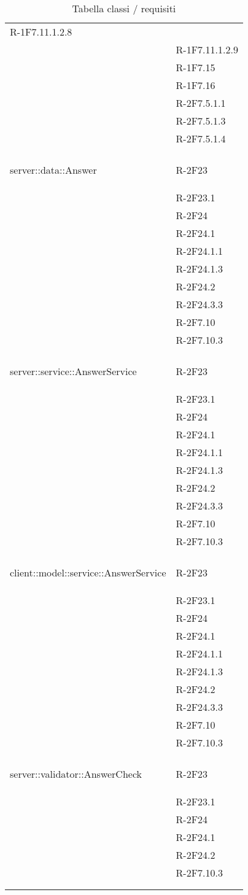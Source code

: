 \begin{longtable}{l p{3cm}}
	R-1F7.11.1.2.8 \tabularnewline &
	
	R-1F7.11.1.2.9 \tabularnewline &
	
	R-1F7.15 \tabularnewline &
	
	R-1F7.16 \tabularnewline &
	
	R-2F7.5.1.1 \tabularnewline &
	
	R-2F7.5.1.3 \tabularnewline &
	
	R-2F7.5.1.4 \tabularnewline &\tabularnewline
	\hline
	\hypertarget{server::data::Answer}{server::data::Answer} & R-2F23 \tabularnewline &
	
	R-2F23.1 \tabularnewline &
	
	R-2F24 \tabularnewline &
	
	R-2F24.1 \tabularnewline &
	
	R-2F24.1.1 \tabularnewline &
	
	R-2F24.1.3 \tabularnewline &
	
	R-2F24.2 \tabularnewline &
	
	R-2F24.3.3 \tabularnewline &
	
	R-2F7.10 \tabularnewline &
	
	R-2F7.10.3 \tabularnewline &\tabularnewline
	\hline
	\hypertarget{server::service::AnswerService}{server::service::AnswerService} & R-2F23 \tabularnewline &
	
	R-2F23.1 \tabularnewline &
	
	R-2F24 \tabularnewline &
	
	R-2F24.1 \tabularnewline &
	
	R-2F24.1.1 \tabularnewline &
	
	R-2F24.1.3 \tabularnewline &
	
	R-2F24.2 \tabularnewline &
	
	R-2F24.3.3 \tabularnewline &
	
	R-2F7.10 \tabularnewline &
	
	R-2F7.10.3 \tabularnewline &\tabularnewline
	\hline
	\hypertarget{client::model::service::AnswerService}{client::model::service::AnswerService} & R-2F23 \tabularnewline &
	
	R-2F23.1 \tabularnewline &
	
	R-2F24 \tabularnewline &
	
	R-2F24.1 \tabularnewline &
	
	R-2F24.1.1 \tabularnewline &
	
	R-2F24.1.3 \tabularnewline &
	
	R-2F24.2 \tabularnewline &
	
	R-2F24.3.3 \tabularnewline &
	
	R-2F7.10 \tabularnewline &
	
	R-2F7.10.3 \tabularnewline &\tabularnewline
	\hline
	\hypertarget{server::validator::AnswerCheck}{server::validator::AnswerCheck} & R-2F23 \tabularnewline &
	
	R-2F23.1 \tabularnewline &
	
	R-2F24 \tabularnewline &
	
	R-2F24.1 \tabularnewline &
	
	R-2F24.2 \tabularnewline &
	
	R-2F7.10.3 \tabularnewline &\tabularnewline
\midrule
\caption{Tabella classi / requisiti} \tabularnewline
\end{longtable}
